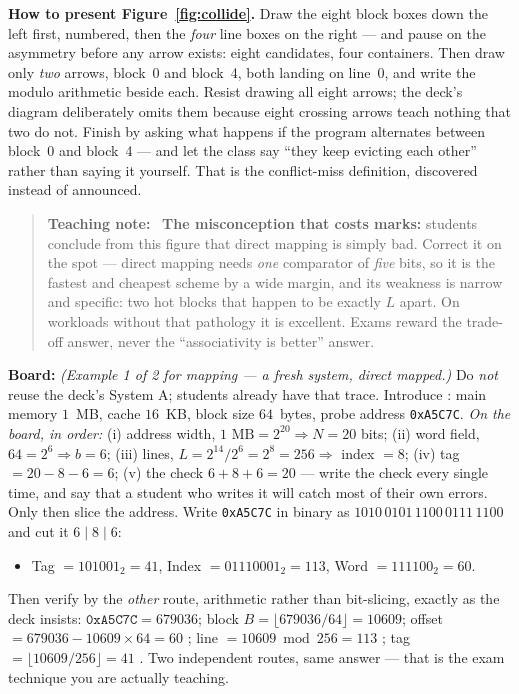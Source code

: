 \documentclass[11pt]{article}
\newenvironment{teachingaside}{\begin{quote}\small\color{primary-gold}\textbf{Teaching note:}\ }{\end{quote}}
\begin{document}
\textbf{How to present Figure~\ref{fig:collide}.} Draw the eight block boxes down the left first, numbered, then the \emph{four} line boxes on the right --- and pause on the asymmetry before any arrow exists: eight candidates, four containers. Then draw only \emph{two} arrows, block~0 and block~4, both landing on line~0, and write the modulo arithmetic beside each. Resist drawing all eight arrows; the deck's diagram deliberately omits them because eight crossing arrows teach nothing that two do not. Finish by asking what happens if the program alternates between block~0 and block~4 --- and let the class say ``they keep evicting each other'' rather than saying it yourself. That is the conflict-miss definition, discovered instead of announced.

\begin{teachingaside}
\textbf{The misconception that costs marks:} students conclude from this figure that direct mapping is simply bad. Correct it on the spot --- direct mapping needs \emph{one} comparator of \emph{five} bits, so it is the fastest and cheapest scheme by a wide margin, and its weakness is narrow and specific: two hot blocks that happen to be exactly $L$ apart. On workloads without that pathology it is excellent. Exams reward the trade-off answer, never the ``associativity is better'' answer.
\end{teachingaside}

\textbf{Board:} \textit{(Example 1 of 2 for mapping --- a fresh system, direct mapped.)} Do \emph{not} reuse the deck's System A; students already have that trace. Introduce : main memory $1$~MB, cache $16$~KB, block size $64$~bytes, probe address \texttt{0xA5C7C}. \emph{On the board, in order:} (i) address width, $1\text{ MB} = 2^{20} \Rightarrow N = 20$ bits; (ii) word field, $64 = 2^6 \Rightarrow b = 6$; (iii) lines, $L = 2^{14}/2^{6} = 2^{8} = 256 \Rightarrow$ index $= 8$; (iv) tag $= 20 - 8 - 6 = 6$; (v) the check $6 + 8 + 6 = 20$ \good{\checkmark} --- write the check every single time, and say that a student who writes it will catch most of their own errors. Only then slice the address. Write \texttt{0xA5C7C} in binary as $1010\,0101\,1100\,0111\,1100$ and cut it $6\mid 8\mid 6$:
\begin{itemize}
  \item Tag $= 101001_2 = 41$, \quad Index $= 01110001_2 = 113$, \quad Word $= 111100_2 = 60$.
\end{itemize}
Then verify by the \emph{other} route, arithmetic rather than bit-slicing, exactly as the deck insists: $\texttt{0xA5C7C} = 679036$; block $B = \lfloor 679036/64 \rfloor = 10609$; offset $= 679036 - 10609\times 64 = 60$ \good{\checkmark}; line $= 10609 \bmod 256 = 113$ \good{\checkmark}; tag $= \lfloor 10609/256 \rfloor = 41$ \good{\checkmark}. Two independent routes, same answer --- that is the exam technique you are actually teaching.
\end{document}

